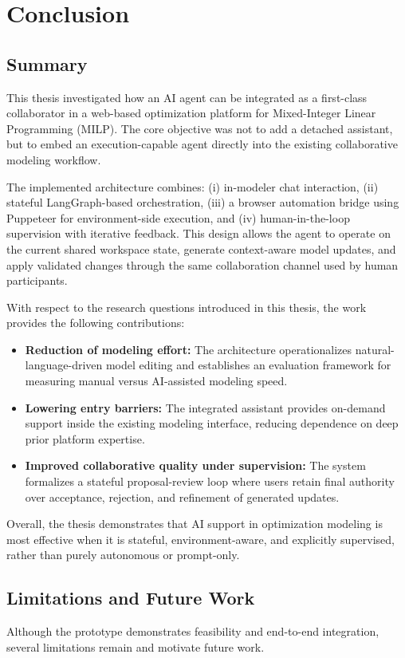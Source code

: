 \chapter{Conclusion}
\section{Summary}
This thesis investigated how an AI agent can be integrated as a first-class collaborator in a web-based optimization platform for Mixed-Integer Linear Programming (MILP). The core objective was not to add a detached assistant, but to embed an execution-capable agent directly into the existing collaborative modeling workflow.

The implemented architecture combines: (i) in-modeler chat interaction, (ii) stateful LangGraph-based orchestration, (iii) a browser automation bridge using Puppeteer for environment-side execution, and (iv) human-in-the-loop supervision with iterative feedback. This design allows the agent to operate on the current shared workspace state, generate context-aware model updates, and apply validated changes through the same collaboration channel used by human participants.

With respect to the research questions introduced in this thesis, the work provides the following contributions:
\begin{itemize}
    \item \textbf{Reduction of modeling effort:} The architecture operationalizes natural-language-driven model editing and establishes an evaluation framework for measuring manual versus AI-assisted modeling speed.
    \item \textbf{Lowering entry barriers:} The integrated assistant provides on-demand support inside the existing modeling interface, reducing dependence on deep prior platform expertise.
    \item \textbf{Improved collaborative quality under supervision:} The system formalizes a stateful proposal-review loop where users retain final authority over acceptance, rejection, and refinement of generated updates.
\end{itemize}

Overall, the thesis demonstrates that AI support in optimization modeling is most effective when it is stateful, environment-aware, and explicitly supervised, rather than purely autonomous or prompt-only.

\section{Limitations and Future Work}
Although the prototype demonstrates feasibility and end-to-end integration, several limitations remain and motivate future work.

